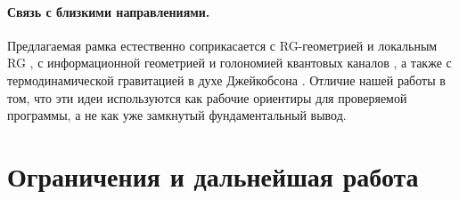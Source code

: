 \documentclass[11pt,a4paper]{article}
\theoremstyle{definition}
\theoremstyle{plain}
\theoremstyle{remark}
\begin{document}
\paragraph{Связь с близкими направлениями.}
Предлагаемая рамка естественно соприкасается с RG-геометрией и локальным RG
\cite{Zamolodchikov1986Irreversibility,Osborn1991LocalRG,CotlerRezchikov2023RGOptimalTransport},
с информационной геометрией и голономией квантовых каналов
\cite{Amari2016InformationGeometry,Uhlmann1986QuantumHolonomy,KultAbergSjoqvist2008HolonomyChannels},
а также с термодинамической гравитацией в духе Джейкобсона
\cite{Jacobson1995EinsteinEOS,ElingGuedensJacobson2009NonEq}.
Отличие нашей работы в том, что эти идеи используются как рабочие ориентиры для проверяемой программы,
а не как уже замкнутый фундаментальный вывод.

\section{Ограничения и дальнейшая работа}
\label{sec:limitations}
\end{document}
